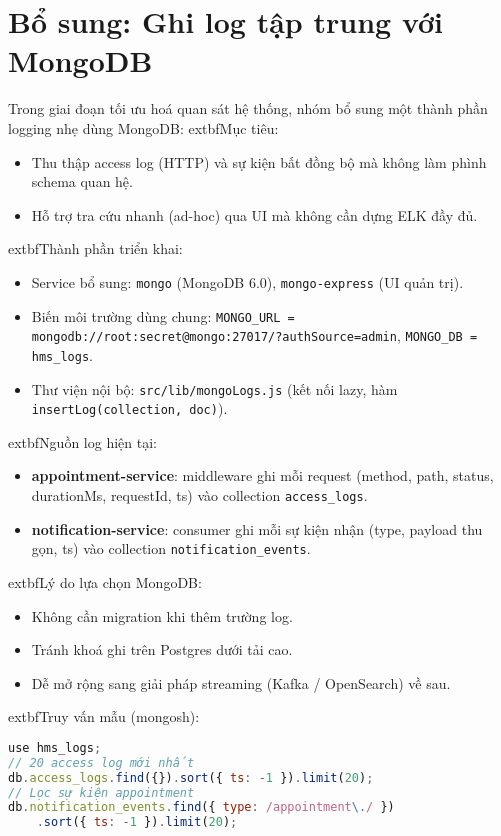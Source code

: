 \documentclass[12pt,a4paper]{report}
\begin{document}
\section{Bổ sung: Ghi log tập trung với MongoDB}\label{sec:logging-mongo}
Trong giai đoạn tối ưu hoá quan sát hệ thống, nhóm bổ sung một thành phần logging nhẹ dùng MongoDB:\newline
	extbf{Mục tiêu:}
\begin{itemize}
    \item Thu thập access log (HTTP) và sự kiện bất đồng bộ mà không làm phình schema quan hệ.
    \item Hỗ trợ tra cứu nhanh (ad-hoc) qua UI mà không cần dựng ELK đầy đủ.
\end{itemize}
	extbf{Thành phần triển khai:}
\begin{itemize}
    \item Service bổ sung: \texttt{mongo} (MongoDB 6.0), \texttt{mongo-express} (UI quản trị).
    \item Biến môi trường dùng chung: \texttt{MONGO\_URL = mongodb://root:secret@mongo:27017/?authSource=admin}, \texttt{MONGO\_DB = hms\_logs}.
    \item Thư viện nội bộ: \texttt{src/lib/mongoLogs.js} (kết nối lazy, hàm \texttt{insertLog(collection, doc)}). 
\end{itemize}
	extbf{Nguồn log hiện tại:}
\begin{itemize}
    \item \textbf{appointment-service}: middleware ghi mỗi request (method, path, status, durationMs, requestId, ts) vào collection \texttt{access\_logs}.
    \item \textbf{notification-service}: consumer ghi mỗi sự kiện nhận (type, payload thu gọn, ts) vào collection \texttt{notification\_events}.
\end{itemize}
	extbf{Lý do lựa chọn MongoDB:}
\begin{itemize}
    \item Không cần migration khi thêm trường log.
    \item Tránh khoá ghi trên Postgres dưới tải cao.
    \item Dễ mở rộng sang giải pháp streaming (Kafka / OpenSearch) về sau.
\end{itemize}
	extbf{Truy vấn mẫu (mongosh):}
\begin{lstlisting}[language=JavaScript]
use hms_logs;
// 20 access log mới nhất
db.access_logs.find({}).sort({ ts: -1 }).limit(20);
// Lọc sự kiện appointment
db.notification_events.find({ type: /appointment\./ })
    .sort({ ts: -1 }).limit(20);
\end{lstlisting}
\end{document}
